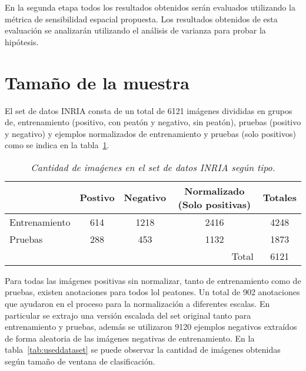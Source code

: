 En la segunda etapa todos los resultados obtenidos serán evaluados utilizando la métrica de sensibilidad espacial propuesta. Los resultados obtenidos de esta evaluación se analizarán utilizando el análisis de varianza para probar la hipótesis.

\section{Tamaño de la muestra}

El set de datos INRIA consta de un total de 6121 imágenes divididas en grupos de, entrenamiento (positivo, con peatón y negativo, sin peatón),  pruebas (positivo y negativo) y ejemplos normalizados de entrenamiento y pruebas (solo positivos) como se indica en la tabla~\ref{tab:inria}.

 \begin{table}[htc]
 \centering
  \caption{\em Cantidad de imaǵenes en el set de datos INRIA según tipo.}  
  \label{tab:inria}
\begin{tabular}{lcc|c|c|}
\cline{2-5}
\multicolumn{1}{l|}{}               & \multicolumn{1}{c|}{Postivo} & Negativo              & Normalizado (Solo positivas) & Totales \\ \hline
\multicolumn{1}{|l|}{Entrenamiento} & \multicolumn{1}{c|}{614}     & 1218                  & 2416                         & 4248    \\ \hline
\multicolumn{1}{|l|}{Pruebas}       & \multicolumn{1}{c|}{288}     & 453                   & 1132                         & 1873    \\ \hline
                                    & \multicolumn{1}{l}{}         & \multicolumn{1}{l|}{} & \multicolumn{1}{r|}{Total}   & 6121    \\ \cline{4-5} 
\end{tabular}
\end{table}

Para todas las imágenes positivas sin normalizar, tanto de entrenamiento como de pruebas, existen anotaciones para todos lol peatones. Un total de 902 anotaciones que ayudaron en el proceso para la normalización a diferentes escalas. En particular se extrajo una versión escalada del set original tanto para entrenamiento y pruebas, además se utilizaron 9120 ejemplos negativos extraídos de forma aleatoria de las imágenes negativas de entrenamiento. En la tabla~\ref{tab:useddataset} se puede observar la cantidad de imágenes obtenidas según tamaño de ventana de clasificación.


